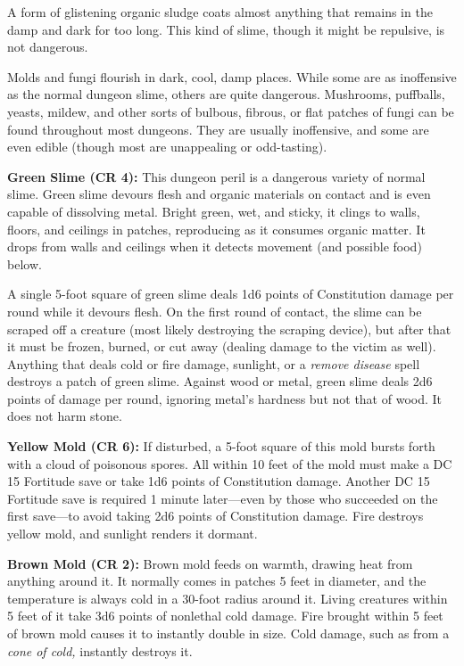 \documentclass{article}
\begin{document}
A form of glistening organic sludge coats almost anything that remains in the damp 
and dark for too long. This kind of slime, though it might be repulsive, is not 
dangerous.

Molds and fungi flourish in dark, cool, damp places. While some are as inoffensive 
as the normal dungeon slime, others are quite dangerous. Mushrooms, puffballs, 
yeasts, mildew, and other sorts of bulbous, fibrous, or flat patches of fungi can 
be found throughout most dungeons. They are usually inoffensive, and some are even 
edible (though most are unappealing or odd-tasting).

\textbf{Green Slime (CR 4):} This dungeon peril is a dangerous variety of normal 
slime. Green slime devours flesh and organic materials on contact and is even capable 
of dissolving metal. Bright green, wet, and sticky, it clings to walls, floors, 
and ceilings in patches, reproducing as it consumes organic matter. It drops from 
walls and ceilings when it detects movement (and possible food) below.

A single 5-foot square of green slime deals 1d6 points of Constitution damage per 
round while it devours flesh. On the first round of contact, the slime can be scraped 
off a creature (most likely destroying the scraping device), but after that it 
must be frozen, burned, or cut away (dealing damage to the victim as well). Anything 
that deals cold or fire damage, sunlight, or a \textit{remove disease }spell destroys 
a patch of green slime. Against wood or metal, green slime deals 2d6 points of 
damage per round, ignoring metal's hardness but not that of wood. It does not harm 
stone.

\textbf{Yellow Mold (CR 6): }If disturbed, a 5-foot square of this mold bursts 
forth with a cloud of poisonous spores. All within 10 feet of the mold must make 
a DC 15 Fortitude save or take 1d6 points of Constitution damage. Another DC 15 
Fortitude save is required 1 minute later---even by those who succeeded on the 
first save---to avoid taking 2d6 points of Constitution damage. Fire destroys yellow 
mold, and sunlight renders it dormant.

\textbf{Brown Mold (CR 2):} Brown mold feeds on warmth, drawing heat from anything 
around it. It normally comes in patches 5 feet in diameter, and the temperature 
is always cold in a 30-foot radius around it. Living creatures within 5 feet of 
it take 3d6 points of nonlethal cold damage. Fire brought within 5 feet of brown 
mold causes it to instantly double in size. Cold damage, such as from a \textit{cone 
of cold, }instantly destroys it.
\end{document}
